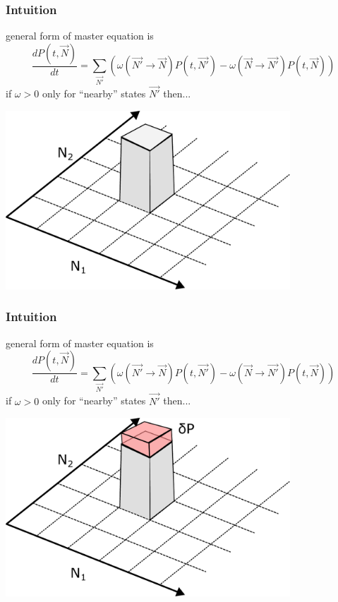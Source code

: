 \documentclass{beamer}
\begin{document}
\begin{frame}
    \frametitle{Intuition}
    general form of master equation is\footnotemark[1]
    \begin{equation}
        \frac{dP(t, \vec{N})}{dt} = \sum_{\vec{N'}} \left(
        \omega(\vec{N'} \rightarrow \vec{N}) P(t, \vec{N'})
        - \omega(\vec{N} \rightarrow \vec{N'}) P(t, \vec{N})
        \right)
    \end{equation}
    if $\omega > 0$ only for ``nearby'' states $\vec{N'}$ then...

    \includegraphics[width=0.8\textwidth]{figures/intuition}
\end{frame}

\begin{frame}
    \frametitle{Intuition}
    general form of master equation is\footnotemark[1]
    \begin{equation}
        \frac{dP(t, \vec{N})}{dt} = \sum_{\vec{N'}} \left(
        \omega(\vec{N'} \rightarrow \vec{N}) P(t, \vec{N'})
        - \omega(\vec{N} \rightarrow \vec{N'}) P(t, \vec{N})
        \right)
    \end{equation}
    if $\omega > 0$ only for ``nearby'' states $\vec{N'}$ then...

    \includegraphics[width=0.8\textwidth]{figures/intuition2}

\end{frame}
\end{document}
